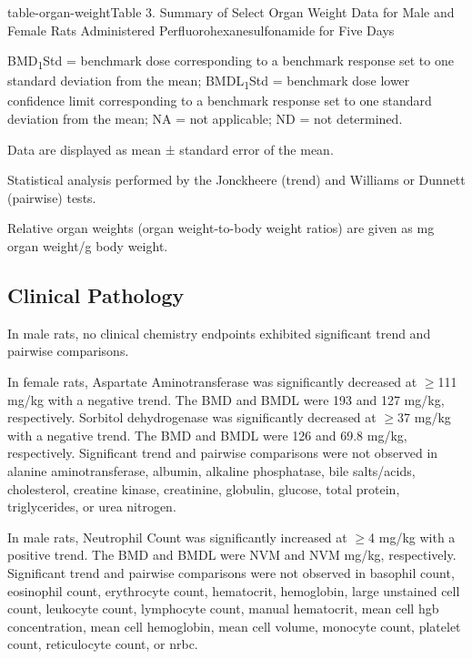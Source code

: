 \begin{landscape}
\begin{niehstable}{table-organ-weight}{Table 3. Summary of Select Organ Weight Data for Male and Female Rats Administered Perfluorohexanesulfonamide for Five Days}
\begin{tablenotes}
\item BMD\textsubscript{1}Std = benchmark dose corresponding to a benchmark response set to one standard deviation from the mean; BMDL\textsubscript{1}Std = benchmark dose lower confidence limit corresponding to a benchmark response set to one standard deviation from the mean; NA = not applicable; ND = not determined.
\item[a] Data are displayed as mean ± standard error of the mean.
\item[b] Statistical analysis performed by the Jonckheere (trend) and Williams or Dunnett (pairwise) tests.
\item[c] Relative organ weights (organ weight-to-body weight ratios) are given as mg organ weight/g body weight.
\end{tablenotes}
\end{niehstable}
\end{landscape}

\subsection{Clinical Pathology}

In male rats, no clinical chemistry endpoints exhibited significant trend and pairwise comparisons.

In female rats, Aspartate Aminotransferase was significantly decreased at \ensuremath{\ge}111 mg/kg with a negative trend. The BMD and BMDL were 193 and 127 mg/kg, respectively. Sorbitol dehydrogenase was significantly decreased at \ensuremath{\ge}37 mg/kg with a negative trend. The BMD and BMDL were 126 and 69.8 mg/kg, respectively. Significant trend and pairwise comparisons were not observed in alanine aminotransferase, albumin, alkaline phosphatase, bile salts/acids, cholesterol, creatine kinase, creatinine, globulin, glucose, total protein, triglycerides, or urea nitrogen.

In male rats, Neutrophil Count was significantly increased at \ensuremath{\ge}4 mg/kg with a positive trend. The BMD and BMDL were NVM and NVM mg/kg, respectively. Significant trend and pairwise comparisons were not observed in basophil count, eosinophil count, erythrocyte count, hematocrit, hemoglobin, large unstained cell count, leukocyte count, lymphocyte count, manual hematocrit, mean cell hgb concentration, mean cell hemoglobin, mean cell volume, monocyte count, platelet count, reticulocyte count, or nrbc.

